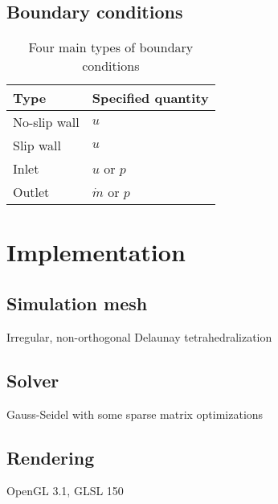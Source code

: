 \documentclass[12pt]{article}
\begin{document}
\subsection{Boundary conditions}

\indent

\begin{table}[H]
  \centering
  \begin{tabular}{| l | l |}
    \hline
    
    Type & Specified quantity \\
    
    \hline
    
    No-slip wall & $u$ \\

    \hline

    Slip wall & $u$ \\
    
    \hline

    Inlet & $u$ or $p$ \\
    
    \hline

    Outlet & $\dot m$ or $p$\\
    
    \hline
  \end{tabular}
  
  \caption{Four main types of boundary conditions}
\end{table}

\section{Implementation}

\subsection{Simulation mesh}

Irregular, non-orthogonal Delaunay tetrahedralization

\subsection{Solver}

Gauss-Seidel with some sparse matrix optimizations

\subsection{Rendering}

OpenGL 3.1, GLSL 150
\end{document}
